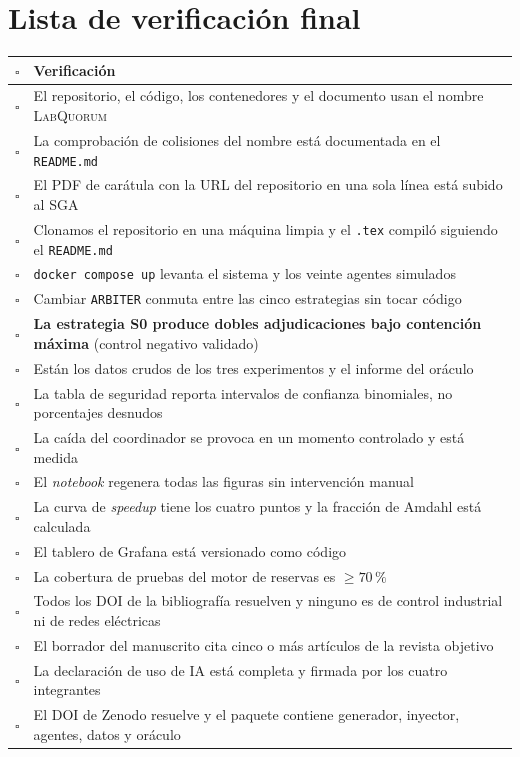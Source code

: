 \documentclass[11pt,a4paper]{article}
\begin{document}
\section{Lista de verificación final}

\begin{center}
	\small
	\begin{tabular}{@{}p{0.7cm}p{14.3cm}@{}}
		\toprule
		\textbf{$\square$} & \textbf{Verificación} \\
		\midrule
		$\square$ & El repositorio, el código, los contenedores y el documento usan el nombre \textsc{LabQuorum} \\
		$\square$ & La comprobación de colisiones del nombre está documentada en el \texttt{README.md} \\
		$\square$ & El PDF de carátula con la URL del repositorio en una sola línea está subido al SGA \\
		$\square$ & Clonamos el repositorio en una máquina limpia y el \texttt{.tex} compiló siguiendo el \texttt{README.md} \\
		$\square$ & \texttt{docker compose up} levanta el sistema y los veinte agentes simulados \\
		$\square$ & Cambiar \texttt{ARBITER} conmuta entre las cinco estrategias sin tocar código \\
		$\square$ & \textbf{La estrategia S0 produce dobles adjudicaciones bajo contención máxima} (control negativo validado) \\
		$\square$ & Están los datos crudos de los tres experimentos y el informe del oráculo \\
		$\square$ & La tabla de seguridad reporta intervalos de confianza binomiales, no porcentajes desnudos \\
		$\square$ & La caída del coordinador se provoca en un momento controlado y está medida \\
		$\square$ & El \emph{notebook} regenera todas las figuras sin intervención manual \\
		$\square$ & La curva de \emph{speedup} tiene los cuatro puntos y la fracción de Amdahl está calculada \\
		$\square$ & El tablero de Grafana está versionado como código \\
		$\square$ & La cobertura de pruebas del motor de reservas es $\geq 70\,\%$ \\
		$\square$ & Todos los DOI de la bibliografía resuelven y ninguno es de control industrial ni de redes eléctricas \\
		$\square$ & El borrador del manuscrito cita cinco o más artículos de la revista objetivo \\
		$\square$ & La declaración de uso de IA está completa y firmada por los cuatro integrantes \\
		$\square$ & El DOI de Zenodo resuelve y el paquete contiene generador, inyector, agentes, datos y oráculo \\
		\bottomrule
	\end{tabular}
\end{center}
\end{document}

